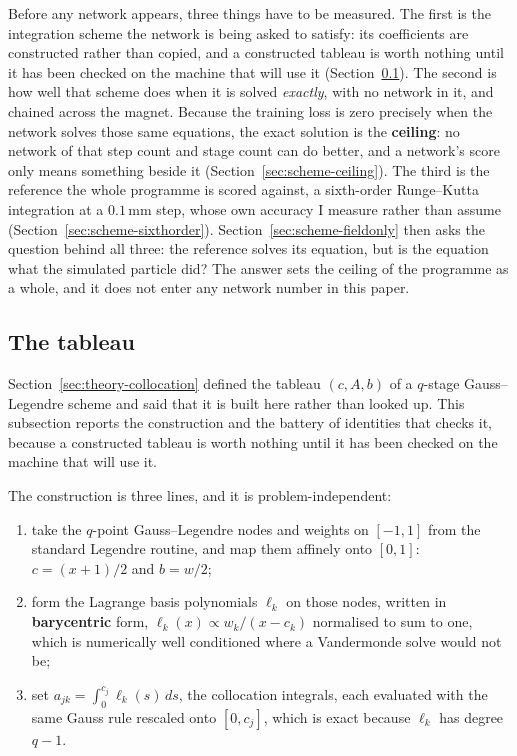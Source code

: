 \documentclass[11pt,a4paper]{article}
\newcommand{\mm}{\ensuremath{\,\mathrm{mm}}}
\begin{document}
Before any network appears, three things have to be measured. The first is the
integration scheme the network is being asked to satisfy: its coefficients are
constructed rather than copied, and a constructed tableau is worth nothing until
it has been checked on the machine that will use it
(Section~\ref{sec:scheme-tableau}). The second is how well that scheme does when
it is solved \emph{exactly}, with no network in it, and chained across the
magnet. Because the training loss is zero precisely when the network solves
those same equations, the exact solution is the \textbf{ceiling}: no network of
that step count and stage count can do better, and a network's score only means
something beside it (Section~\ref{sec:scheme-ceiling}). The third is the
reference the whole programme is scored against, a sixth-order Runge--Kutta
integration at a $0.1\mm$ step, whose own accuracy I measure rather than assume
(Section~\ref{sec:scheme-sixthorder}). Section~\ref{sec:scheme-fieldonly} then
asks the question behind all three: the reference solves its equation, but is
the equation what the simulated particle did? The answer sets the ceiling of the
programme as a whole, and it does not enter any network number in this paper.

\subsection{The tableau}
\label{sec:scheme-tableau}

Section~\ref{sec:theory-collocation} defined the tableau $(c, A, b)$ of a
$q$-stage Gauss--Legendre scheme and said that it is built here rather than
looked up. This subsection reports the construction and the battery of
identities that checks it, because a constructed tableau is worth nothing until
it has been checked on the machine that will use it.

The construction is three lines, and it is problem-independent:
\begin{enumerate}\setlength{\itemsep}{2pt}
  \item take the $q$-point Gauss--Legendre nodes and weights on $[-1, 1]$ from
  the standard Legendre routine, and map them affinely onto $[0, 1]$:
  $c = (x+1)/2$ and $b = w/2$;
  \item form the Lagrange basis polynomials $\ell_k$ on those nodes, written in
  \textbf{barycentric} form, $\ell_k(x) \propto w_k/(x - c_k)$ normalised to sum
  to one, which is numerically well conditioned where a Vandermonde solve would
  not be;
  \item set $a_{jk} = \int_{0}^{c_j} \ell_k(s)\,ds$, the collocation integrals,
  each evaluated with the same Gauss rule rescaled onto $[0, c_j]$, which is
  exact because $\ell_k$ has degree $q - 1$.
\end{enumerate}
\end{document}
